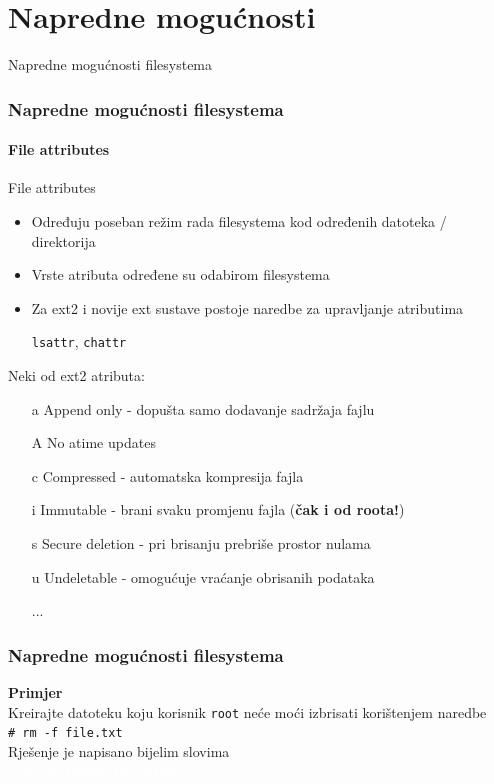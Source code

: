 \documentclass[t]{beamer}
\begin{document}
\section{Napredne mogućnosti}

\begin{frame}
	\vspace*{\fill}
		\begin{center}
			\Huge{Napredne mogućnosti filesystema}
		\end{center}
	\vspace*{\fill}
\end{frame}

\begin{frame}
	\frametitle{Napredne mogućnosti filesystema}
	\framesubtitle{File attributes}
	File attributes
	\begin{itemize}
		\item Određuju poseban režim rada filesystema kod određenih datoteka / direktorija
		\item Vrste atributa određene su odabirom filesystema
		\item Za ext2 i novije ext sustave postoje naredbe za upravljanje atributima
		\item[] \texttt{lsattr}, \texttt{chattr}
	\end{itemize}
	\vspace{1em}
	Neki od ext2 atributa:
	\begin{itemize}
		\item[a] Append only - dopušta samo dodavanje sadržaja fajlu
		\item[A] No atime updates
		\item[c] Compressed - automatska kompresija fajla
		\item[i] Immutable - brani svaku promjenu fajla (\textbf{čak i od roota!})
		\item[s] Secure deletion - pri brisanju prebriše prostor nulama
		\item[u] Undeletable - omogućuje vraćanje obrisanih podataka
		\item[] ...
	\end{itemize}
\end{frame}

\begin{frame}[fragile]
	\frametitle{Napredne mogućnosti filesystema}
	\textbf{Primjer}\\
	\vspace{1em}
	Kreirajte datoteku koju korisnik \texttt{root} neće moći izbrisati korištenjem naredbe\\
	\verb|# rm -f file.txt|\\
	\vspace{1em}
	{\footnotesize Rješenje je napisano bijelim slovima}\\
	\vfill
	\textcolor{white}{Postaviti immutable atribut}
\end{frame}
\end{document}
